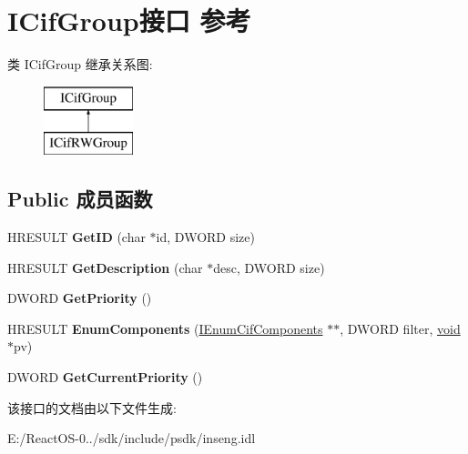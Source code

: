 \hypertarget{interface_i_cif_group}{}\section{I\+Cif\+Group接口 参考}
\label{interface_i_cif_group}
类 I\+Cif\+Group 继承关系图\+:\begin{figure}[H]
\begin{center}
\leavevmode
\includegraphics[height=2.000000cm]{interface_i_cif_group}
\end{center}
\end{figure}
\subsection*{Public 成员函数}
\begin{DoxyCompactItemize}
\item 
\mbox{\label{interface_i_cif_group_a9edd33bafe7bf7cdb36c12483ce78a43}} 
H\+R\+E\+S\+U\+LT {\bfseries Get\+ID} (char $\ast$id, D\+W\+O\+RD size)
\item 
\mbox{\label{interface_i_cif_group_a727b32dd5d9f405f92f04d1146fca632}} 
H\+R\+E\+S\+U\+LT {\bfseries Get\+Description} (char $\ast$desc, D\+W\+O\+RD size)
\item 
\mbox{\label{interface_i_cif_group_ab172f22493dedb382744fb43b0bf2623}} 
D\+W\+O\+RD {\bfseries Get\+Priority} ()
\item 
\mbox{\label{interface_i_cif_group_a29191abaacb9bd1c0870ca4e17783bc2}} 
H\+R\+E\+S\+U\+LT {\bfseries Enum\+Components} (\hyperlink{interface_i_enum_cif_components}{I\+Enum\+Cif\+Components} $\ast$$\ast$, D\+W\+O\+RD filter, \hyperlink{interfacevoid}{void} $\ast$pv)
\item 
\mbox{\label{interface_i_cif_group_a3e6c8920601867347d4a56658ed5ccfb}} 
D\+W\+O\+RD {\bfseries Get\+Current\+Priority} ()
\end{DoxyCompactItemize}


该接口的文档由以下文件生成\+:\begin{DoxyCompactItemize}
\item 
E\+:/\+React\+O\+S-\/0../sdk/include/psdk/inseng.\+idl\end{DoxyCompactItemize}
